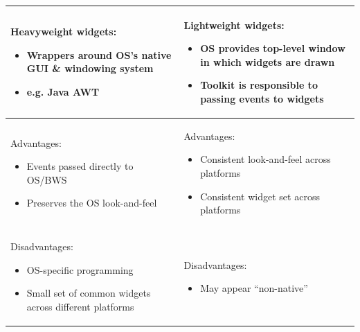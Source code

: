 \documentclass[11pt, oneside]{article}
\newenvironment{itemized}{\begin{itemize}[noitemsep, topsep=0pt, leftmargin=*]}{\end{itemize}}  %
\begin{document}
\hspace{-5em}
\begin{tabular}{|l|l|}
\hline
\begin{minipage}[t]{0.45\textwidth}
\textbf{Heavyweight widgets}:
    \begin{itemized}
    \item Wrappers around OS's native GUI \& windowing system 
    \item e.g. Java AWT
    \end{itemized}
    \vspace*{0.5em}
\end{minipage}
&
\begin{minipage}[t]{0.45\textwidth}
\textbf{Lightweight widgets}:
    \begin{itemized}
    \item OS provides top-level window in which widgets are drawn
    \item Toolkit is responsible to passing events to widgets
    \end{itemized}
    \vspace*{0.5em}
\end{minipage}  \\
\hline
\begin{minipage}[t]{0.45\textwidth}
Advantages:
    \begin{itemized}
    \item Events passed directly to OS/BWS
    \item Preserves the OS look-and-feel
    \end{itemized}
    \vspace*{0.5em}
\end{minipage}
&
\begin{minipage}[t]{0.45\textwidth}
Advantages:
    \begin{itemized}
    \item Consistent look-and-feel across platforms
    \item Consistent widget set across platforms
    \end{itemized}
    \vspace*{0.5em}
\end{minipage}  \\
\hline
\begin{minipage}[t]{0.45\textwidth}
Disadvantages:
    \begin{itemized}
    \item OS-specific programming
    \item Small set of common widgets across different platforms
    \end{itemized}
    \vspace*{0.5em}
\end{minipage}
&
\begin{minipage}[t]{0.45\textwidth}
Disadvantages:
    \begin{itemized}
        \item May appear ``non-native''
    \end{itemized}
    \vspace*{0.5em}
\end{minipage}  \\
\hline
\end{tabular} \\
\end{document}

